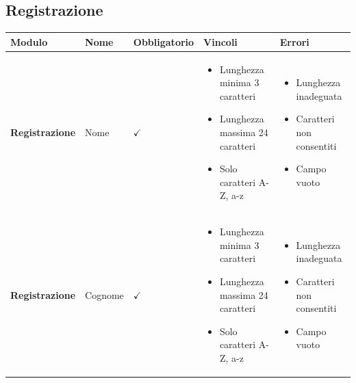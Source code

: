 \documentclass[12pt]{article}
\begin{document}
 
 \subsection{Registrazione}
 \setlength\LTleft{0pt}
 \setlength\LTright{0pt}
 \begin{longtable}{|l|l|l|l|l|}
 \hline
 Modulo & Nome & Obbligatorio & Vincoli & Errori\\\hline
 \endhead
 \hline
 \textbf{Registrazione} & Nome & $\checkmark$ & \begin{minipage}{3.5cm}
 \vspace{5pt}
 \begin{itemize}
 \item Lunghezza minima 3 caratteri
 \item Lunghezza massima 24 caratteri
 \item Solo caratteri A-Z, a-z
 \end{itemize}
 \vspace{5pt}
 \end{minipage} & \begin{minipage}{4cm}
 \vspace{5pt}
 \begin{itemize}
 \item Lunghezza inadeguata
 \item Caratteri non consentiti
 \item Campo vuoto
 \end{itemize}
 \vspace{5pt}
 \end{minipage} \\ \hline
 
 \textbf{Registrazione} & Cognome & $\checkmark$ & \begin{minipage}{3.5cm}
 \vspace{5pt}
 \begin{itemize}
 \item Lunghezza minima 3 caratteri
 \item Lunghezza massima 24 caratteri
 \item Solo caratteri A-Z, a-z
 \end{itemize}
 \vspace{5pt}
 \end{minipage} & \begin{minipage}{4cm}
 \vspace{5pt}
 \begin{itemize}
 \item Lunghezza inadeguata
 \item Caratteri non consentiti
 \item Campo vuoto
 \end{itemize}
 \vspace{5pt}
 \end{minipage} \\ \hline
 

\end{longtable}
\end{document}
